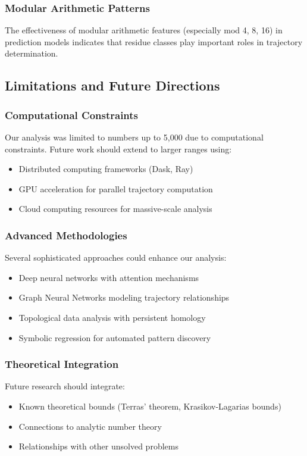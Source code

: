 \documentclass[12pt,a4paper]{article}
\begin{document}
\subsubsection{Modular Arithmetic Patterns}
The effectiveness of modular arithmetic features (especially mod 4, 8, 16) in prediction models indicates that residue classes play important roles in trajectory determination.

\subsection{Limitations and Future Directions}

\subsubsection{Computational Constraints}
Our analysis was limited to numbers up to 5,000 due to computational constraints. Future work should extend to larger ranges using:
\begin{itemize}
\item Distributed computing frameworks (Dask, Ray)
\item GPU acceleration for parallel trajectory computation
\item Cloud computing resources for massive-scale analysis
\end{itemize}

\subsubsection{Advanced Methodologies}
Several sophisticated approaches could enhance our analysis:
\begin{itemize}
\item Deep neural networks with attention mechanisms
\item Graph Neural Networks modeling trajectory relationships
\item Topological data analysis with persistent homology
\item Symbolic regression for automated pattern discovery
\end{itemize}

\subsubsection{Theoretical Integration}
Future research should integrate:
\begin{itemize}
\item Known theoretical bounds (Terras' theorem, Krasikov-Lagarias bounds)
\item Connections to analytic number theory
\item Relationships with other unsolved problems
\end{itemize}
\end{document}
